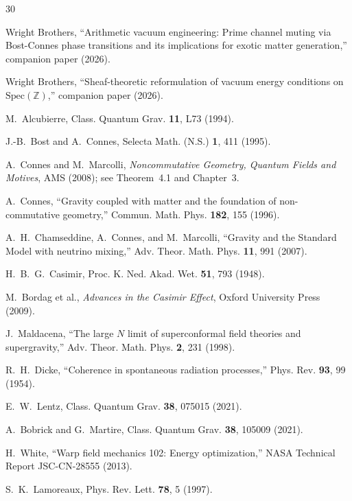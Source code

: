 \documentclass[11pt,a4paper]{article}
\newcommand{\Spec}{\mathrm{Spec}}
\begin{document}
\begin{thebibliography}{30}

Wright Brothers,
``Arithmetic vacuum engineering: Prime channel muting via
Bost-Connes phase transitions and its implications for
exotic matter generation,''
companion paper (2026).

Wright Brothers,
``Sheaf-theoretic reformulation of vacuum energy conditions
on $\Spec(\mathbb{Z})$,''
companion paper (2026).

M.~Alcubierre,
Class. Quantum Grav. \textbf{11}, L73 (1994).

J.-B.~Bost and A.~Connes,
Selecta Math. (N.S.) \textbf{1}, 411 (1995).

A.~Connes and M.~Marcolli,
\emph{Noncommutative Geometry, Quantum Fields and Motives},
AMS (2008); see Theorem~4.1 and Chapter~3.

A.~Connes,
``Gravity coupled with matter and the foundation of
non-commutative geometry,''
Commun. Math. Phys. \textbf{182}, 155 (1996).

A.~H.~Chamseddine, A.~Connes, and M.~Marcolli,
``Gravity and the Standard Model with neutrino mixing,''
Adv. Theor. Math. Phys. \textbf{11}, 991 (2007).

H.~B.~G.~Casimir,
Proc. K. Ned. Akad. Wet. \textbf{51}, 793 (1948).

M.~Bordag et al.,
\emph{Advances in the Casimir Effect},
Oxford University Press (2009).

J.~Maldacena,
``The large $N$ limit of superconformal field theories
and supergravity,''
Adv. Theor. Math. Phys. \textbf{2}, 231 (1998).

R.~H.~Dicke,
``Coherence in spontaneous radiation processes,''
Phys. Rev. \textbf{93}, 99 (1954).

E.~W.~Lentz,
Class. Quantum Grav. \textbf{38}, 075015 (2021).

A.~Bobrick and G.~Martire,
Class. Quantum Grav. \textbf{38}, 105009 (2021).

H.~White,
``Warp field mechanics 102: Energy optimization,''
NASA Technical Report JSC-CN-28555 (2013).

S.~K.~Lamoreaux,
Phys. Rev. Lett. \textbf{78}, 5 (1997).

\end{thebibliography}
\end{document}
